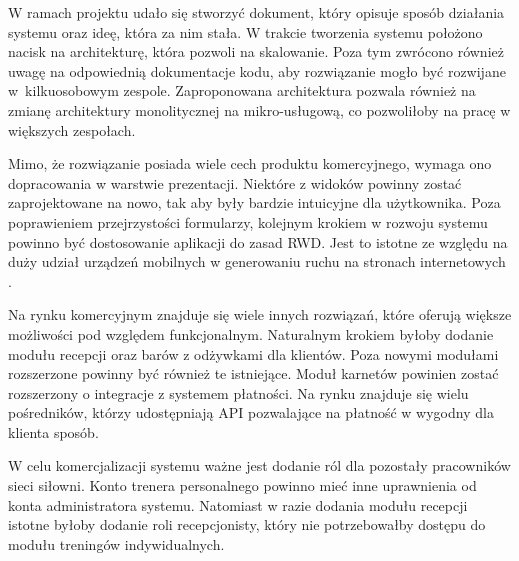 \documentclass[a4paper,twoside,12pt]{book}
\begin{document}
W ramach projektu udało się stworzyć dokument, który opisuje sposób działania systemu oraz ideę, która za nim stała. W trakcie tworzenia systemu położono nacisk na architekturę, która pozwoli na skalowanie. Poza tym zwrócono również uwagę na odpowiednią dokumentacje kodu, aby rozwiązanie mogło być rozwijane w~kilkuosobowym zespole. Zaproponowana architektura pozwala również na zmianę architektury monolitycznej na mikro-usługową, co pozwoliłoby na pracę w większych zespołach.

Mimo, że rozwiązanie posiada wiele cech produktu komercyjnego, wymaga ono dopracowania w warstwie prezentacji. Niektóre z widoków powinny zostać zaprojektowane na nowo, tak aby były bardzie intuicyjne dla użytkownika. Poza poprawieniem przejrzystości formularzy, kolejnym krokiem w rozwoju systemu powinno być dostosowanie aplikacji do zasad RWD. Jest to istotne ze względu na duży udział urządzeń mobilnych w generowaniu ruchu na stronach internetowych \cite{bib:mobileVsDesktop}.

Na rynku komercyjnym znajduje się wiele innych rozwiązań, które oferują większe możliwości pod względem funkcjonalnym. Naturalnym krokiem byłoby dodanie modułu recepcji oraz barów z odżywkami dla klientów. Poza nowymi modułami rozszerzone powinny być również te istniejące. Moduł karnetów powinien zostać rozszerzony o integracje z systemem płatności. Na rynku znajduje się wielu pośredników, którzy udostępniają API pozwalające na płatność w wygodny dla klienta sposób.

W celu komercjalizacji systemu ważne jest dodanie ról dla pozostały pracowników sieci siłowni. Konto trenera personalnego powinno mieć inne uprawnienia od konta administratora systemu. Natomiast w razie dodania modułu recepcji istotne byłoby dodanie roli recepcjonisty, który nie potrzebowałby dostępu do modułu treningów indywidualnych.
 


\end{document}
